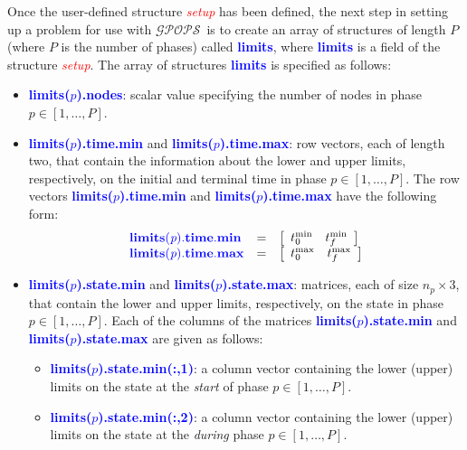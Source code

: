 \documentclass[10pt,final]{report}
\newcommand{\gpops}{$\mathcal{GPOPS}$~}
\newcommand{\bfblue}[1]{\textcolor{blue}{\bf #1}}
\newcommand{\slred}[1]{\textcolor{red}{\sl #1}}
\begin{document}
Once the user-defined structure \slred{setup} has been defined, the next
step in setting up a problem for use with \gpops is to create
an array of structures of length $P$ (where $P$ is the number of
phases) called \bfblue{limits}, where \bfblue{limits} is a
field of the structure \slred{setup}.  The array of structures
\bfblue{limits} is specified as follows:
\begin{itemize}
  \item \bfblue{limits($p$).nodes}: scalar value specifying the number of nodes in phase $p\in[1,\ldots,P]$.
  \item \bfblue{limits($p$).time.min} and \bfblue{limits($p$).time.max}:
    row vectors, each of length two, that contain the information
    about the lower and upper limits, respectively, on the initial and terminal time in phase
    $p\in[1,\ldots,P]$.  The row vectors
    \bfblue{limits($p$).time.min} and \bfblue{limits($p$).time.max} have the following form:
    \begin{displaymath}
      \begin{array}{lcl}
        \bfblue{limits(\textit{p}).time.min} & = & \left[\begin{array}{cc} t_0^{\textrm{min}} &
            t_f^{\textrm{min}} \end{array} \right] \\
        \bfblue{limits(\textit{p}).time.max} & = & \left[\begin{array}{cc} t_0^{\textrm{max}} &
            t_f^{\textrm{max}} \end{array} \right]
      \end{array}
    \end{displaymath}
  \item \bfblue{limits($p$).state.min} and \bfblue{limits($p$).state.max}:
    matrices, each of size $n_p \times 3$,
    that contain the lower and upper limits, respectively, on the
    state in phase $p\in[1,\ldots,P]$.  Each of the columns of the
    matrices \bfblue{limits($p$).state.min} and
    \bfblue{limits($p$).state.max} are given as follows:
    \begin{itemize}
      \item \bfblue{limits($p$).state.min(:,1)}: a column vector
        containing the lower (upper) limits on the state at the {\em
          start} of phase $p\in[1,\ldots,P]$.
      \item \bfblue{limits($p$).state.min(:,2)}: a column vector
        containing the lower (upper) limits on the state at the {\em
          during} phase $p\in[1,\ldots,P]$.

\end{itemize}
\end{itemize}
\end{document}
